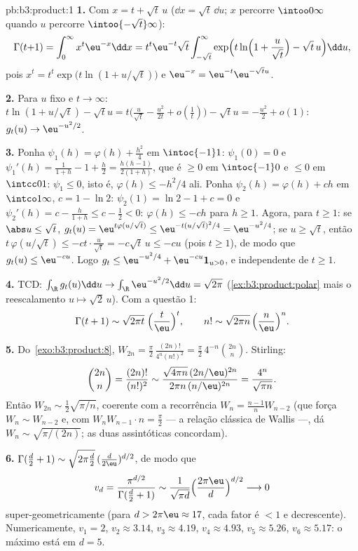 \begin{solution}{pb:b3:product:1}
\textbf{1.} Com $x = t + \sqrt t\,u$ ($\dd x = \sqrt
t\,\dd u$; $x$ percorre $\intoo0\infty$ quando $u$ percorre
$\intoo{-\sqrt t}\infty$):
\[
\Gamma(t{+}1) = \int_0^\infty x^t\eu^{-x}\dd x
= t^t\eu^{-t}\sqrt t\int_{-\sqrt t}^{\infty}
\exp\Bigl(t\ln\Bigl(1 + \frac u{\sqrt t}\Bigr) - \sqrt
t\,u\Bigr)\dd u,
\]
pois $x^t = t^t\exp\bigl(t\ln(1 + u/\sqrt t)\bigr)$ e
$\eu^{-x} = \eu^{-t}\eu^{-\sqrt tu}$.

\textbf{2.} Para $u$ fixo e $t \to \infty$: $t\ln(1 +
u/\sqrt t) - \sqrt tu = t\bigl(\frac u{\sqrt t} -
\frac{u^2}{2t} + o(\frac1t)\bigr) - \sqrt tu = -\frac{u^2}2 +
o(1)$: $g_t(u) \to \eu^{-u^2/2}$.

\textbf{3.} Ponha $\psi_1(h) = \varphi(h) + \frac{h^2}4$ em
$\intoc{-1}1$: $\psi_1(0) = 0$ e $\psi_1'(h) = \frac1{1+h} -
1 + \frac h2 = \frac{h(h-1)}{2(1+h)}$, que é $\geq 0$ em
$\intoc{-1}0$ e $\leq 0$ em $\intcc01$: $\psi_1 \leq 0$,
isto é, $\varphi(h) \leq -h^2/4$ ali. Ponha $\psi_2(h) =
\varphi(h) + ch$ em $\intco1\infty$, $c = 1 - \ln2$: $\psi_2(1)
= \ln2 - 1 + c = 0$ e $\psi_2'(h) = c - \frac h{1+h} \leq c -
\frac12 < 0$: $\varphi(h) \leq -ch$ para $h \geq 1$. Agora, para $t
\geq 1$: se $\abs u \leq \sqrt t$, $g_t(u) =
\eu^{t\varphi(u/\sqrt t)} \leq \eu^{-t(u/\sqrt t)^2/4} =
\eu^{-u^2/4}$; se $u \geq \sqrt t$, então $t\,\varphi(u/\sqrt t) \leq
-ct\cdot\frac u{\sqrt t} = -c\sqrt t\,u \leq -cu$ (pois $t \geq
1$), de modo que $g_t(u) \leq \eu^{-cu}$. Logo $g_t \leq \eu^{-u^2/4} +
\eu^{-cu}\mathbf 1_{u>0}$,  e independente de $t \geq
1$.

\textbf{4.} TCD: $\int_\R g_t(u)\dd u \to
\int_\R\eu^{-u^2/2}\dd u = \sqrt{2\pi}$
(\cref{ex:b3:product:polar} mais o reescalamento
$u\mapsto\sqrt2\,u$). Com a questão 1:
\[
\Gamma(t + 1) \sim \sqrt{2\pi t}\;\Bigl(\frac
t\eu\Bigr)^t,\qquad
n! \sim \sqrt{2\pi n}\,\Bigl(\frac n\eu\Bigr)^n .
\]

\textbf{5.} Do~\cref{exo:b3:product:8}, $W_{2n} =
\frac\pi2\,\frac{(2n)!}{4^n(n!)^2} =
\frac\pi2\,4^{-n}\binom{2n}n$. Stirling:
\[
\binom{2n}{n} = \frac{(2n)!}{(n!)^2}
\sim \frac{\sqrt{4\pi n}\,(2n/\eu)^{2n}}
{2\pi n\,(n/\eu)^{2n}} = \frac{4^n}{\sqrt{\pi n}} .
\]
Então $W_{2n} \sim \frac12\sqrt{\pi/n}$, coerente com a
recorrência $W_n = \frac{n-1}nW_{n-2}$ (que força $W_n \sim
W_{n-2}$ e, com $W_nW_{n-1}\cdot n = \frac\pi2$ --- a
relação clássica de Wallis ---, dá $W_n \sim
\sqrt{\pi/(2n)}$; as duas assintóticas concordam).

\textbf{6.} $\Gamma(\frac d2 + 1) \sim \sqrt{2\pi\frac
d2}\,(\frac d{2\eu})^{d/2}$, de modo que
\[
v_d = \frac{\pi^{d/2}}{\Gamma(\frac d2 + 1)}
\sim \frac{1}{\sqrt{\pi d}}\Bigl(\frac{2\pi\eu}
d\Bigr)^{d/2} \longrightarrow 0
\]
super-geometricamente (para $d > 2\pi\eu \approx 17$, cada fator é
$< 1$ e decrescente). Numericamente, $v_1 = 2$, $v_2 \approx
3.14$, $v_3 \approx 4.19$, $v_4 \approx 4.93$, $v_5 \approx
5.26$, $v_6 \approx 5.17$: o máximo está em $d = 5$.


\end{solution}
